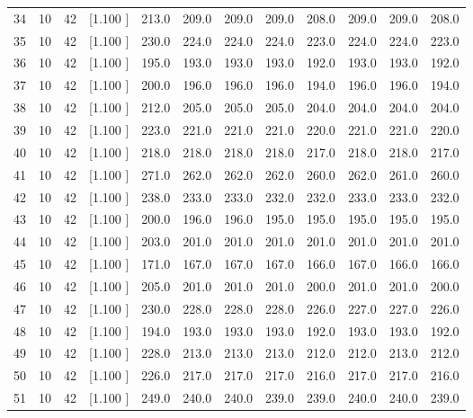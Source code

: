 \documentclass[12pt,a4paper]{article}
\begin{document}
\begin{center}
{\begin{tabular}{r r r r r r r r r r r r}
  34& 10& 42&[1.100     ]&   213.0&   209.0&   209.0&   209.0&   208.0&   209.0&   209.0&   208.0\\[-0.02in]
  35& 10& 42&[1.100     ]&   230.0&   224.0&   224.0&   224.0&   223.0&   224.0&   224.0&   223.0\\[-0.02in]
  36& 10& 42&[1.100     ]&   195.0&   193.0&   193.0&   193.0&   192.0&   193.0&   193.0&   192.0\\[-0.02in]
  37& 10& 42&[1.100     ]&   200.0&   196.0&   196.0&   196.0&   194.0&   196.0&   196.0&   194.0\\[-0.02in]
  38& 10& 42&[1.100     ]&   212.0&   205.0&   205.0&   205.0&   204.0&   204.0&   204.0&   204.0\\[-0.02in]
  39& 10& 42&[1.100     ]&   223.0&   221.0&   221.0&   221.0&   220.0&   221.0&   221.0&   220.0\\[-0.02in]
  40& 10& 42&[1.100     ]&   218.0&   218.0&   218.0&   218.0&   217.0&   218.0&   218.0&   217.0\\[-0.02in]
  41& 10& 42&[1.100     ]&   271.0&   262.0&   262.0&   262.0&   260.0&   262.0&   261.0&   260.0\\[-0.02in]
  42& 10& 42&[1.100     ]&   238.0&   233.0&   233.0&   232.0&   232.0&   233.0&   233.0&   232.0\\[-0.02in]
  43& 10& 42&[1.100     ]&   200.0&   196.0&   196.0&   195.0&   195.0&   195.0&   195.0&   195.0\\[-0.02in]
  44& 10& 42&[1.100     ]&   203.0&   201.0&   201.0&   201.0&   201.0&   201.0&   201.0&   201.0\\[-0.02in]
  45& 10& 42&[1.100     ]&   171.0&   167.0&   167.0&   167.0&   166.0&   167.0&   166.0&   166.0\\[-0.02in]
  46& 10& 42&[1.100     ]&   205.0&   201.0&   201.0&   201.0&   200.0&   201.0&   201.0&   200.0\\[-0.02in]
  47& 10& 42&[1.100     ]&   230.0&   228.0&   228.0&   228.0&   226.0&   227.0&   227.0&   226.0\\[-0.02in]
  48& 10& 42&[1.100     ]&   194.0&   193.0&   193.0&   193.0&   192.0&   193.0&   193.0&   192.0\\[-0.02in]
  49& 10& 42&[1.100     ]&   228.0&   213.0&   213.0&   213.0&   212.0&   212.0&   213.0&   212.0\\[-0.02in]
  50& 10& 42&[1.100     ]&   226.0&   217.0&   217.0&   217.0&   216.0&   217.0&   217.0&   216.0\\[-0.02in]
  51& 10& 42&[1.100     ]&   249.0&   240.0&   240.0&   239.0&   239.0&   240.0&   240.0&   239.0\\[-0.02in]

\end{tabular}}
\end{center}
\end{document}
